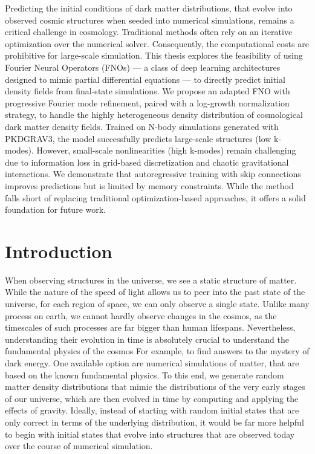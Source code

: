 \documentclass{article}
\begin{document}
Predicting the initial conditions of dark matter distributions, that evolve into observed cosmic structures when seeded into numerical simulations, remains a critical challenge in cosmology. Traditional methods often rely on an iterative optimization over the numerical solver. Consequently, the computational costs are prohibitive for large-scale simulation. This thesis explores the feasibility of using Fourier Neural Operators (FNOs) — a class of deep learning architectures designed to mimic partial differential equations — to directly predict initial density fields from final-state simulations. We propose an adapted FNO with progressive Fourier mode refinement, paired with a log-growth normalization strategy, to handle the highly heterogeneous density distribution of cosmological dark matter density fields. Trained on N-body simulations generated with PKDGRAV3, the model successfully predicts large-scale structures (low k-modes). However, small-scale nonlinearities (high k-modes) remain challenging due to information loss in grid-based discretization and chaotic gravitational interactions. We demonstrate that autoregressive training with skip connections improves predictions but is limited by memory constraints. While the method falls short of replacing traditional optimization-based approaches, it offers a solid foundation for future work. 

\newpage 

\tableofcontents

\newpage


\section{Introduction}


When observing structures in the universe, we see a static structure of matter. While the nature of the speed of light allows us to peer into the past state of the universe, for each region of space, we can only observe a single state. Unlike many process on earth, we cannot hardly observe changes in the cosmos, as the timescales of such processes are far bigger than human lifespans. Nevertheless, understanding their evolution in time is absolutely crucial to understand the fundamental physics of the cosmos For example, to find answers to the mystery of dark energy. One available option are numerical simulations of matter, that are based on the known fundamental physics. To this end, we generate random matter density distributions that mimic the distributions of the very early stages of our universe, which are then evolved in time by computing and applying the effects of gravity. Ideally, instead of starting with random initial states that are only correct in terms of the underlying distribution, it would be far more helpful to begin with initial states that evolve into structures that are observed today over the course of numerical simulation. 
\end{document}
